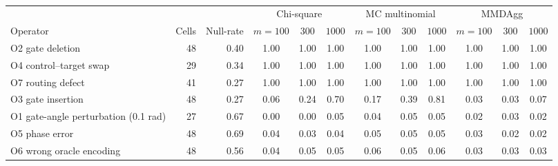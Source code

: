 \begin{table}[ht]
\centering
\caption{}
\label{tab:struct_joint}
\small
\begin{tabular}{l r r ccc ccc ccc}
\toprule
& & & \multicolumn{3}{c}{Chi-square} & \multicolumn{3}{c}{MC multinomial} & \multicolumn{3}{c}{MMDAgg} \\
\cmidrule(lr){4-6} \cmidrule(lr){7-9} \cmidrule(lr){10-12}
Operator & Cells & Null-rate & $m{=}100$ & $300$ & $1000$ & $m{=}100$ & $300$ & $1000$ & $m{=}100$ & $300$ & $1000$ \\
\midrule
O2 gate deletion & 48 & 0.40 & 1.00 & 1.00 & 1.00 & 1.00 & 1.00 & 1.00 & 1.00 & 1.00 & 1.00 \\
O4 control--target swap & 29 & 0.34 & 1.00 & 1.00 & 1.00 & 1.00 & 1.00 & 1.00 & 1.00 & 1.00 & 1.00 \\
O7 routing defect & 41 & 0.27 & 1.00 & 1.00 & 1.00 & 1.00 & 1.00 & 1.00 & 1.00 & 1.00 & 1.00 \\
O3 gate insertion & 48 & 0.27 & 0.06 & 0.24 & 0.70 & 0.17 & 0.39 & 0.81 & 0.03 & 0.03 & 0.07 \\
O1 gate-angle perturbation (0.1 rad) & 27 & 0.67 & 0.00 & 0.00 & 0.05 & 0.04 & 0.05 & 0.05 & 0.02 & 0.03 & 0.02 \\
O5 phase error & 48 & 0.69 & 0.04 & 0.03 & 0.04 & 0.05 & 0.05 & 0.05 & 0.03 & 0.02 & 0.02 \\
O6 wrong oracle encoding & 48 & 0.56 & 0.04 & 0.05 & 0.05 & 0.06 & 0.05 & 0.06 & 0.03 & 0.03 & 0.03 \\
\bottomrule
\end{tabular}
\end{table}
